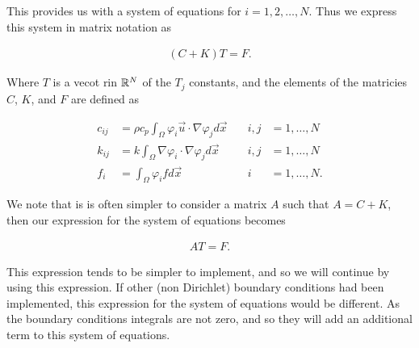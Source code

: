 \documentclass[../fem.tex]{subfiles}
\begin{document}
This provides us with a system of equations for $i=1,2,\ldots,N$. Thus we
express this system in matrix notation as

\begin{align}\label{eq:mat_rep}
  (C+K)T=F.
\end{align}

Where $T$ is a vecot rin $\mathbb{R}^N$ of the $T_j$ constants, and the elements of the
matricies $C$, $K$, and $F$ are defined as

\begin{align*}
  c_{ij}&=\rho c_p\int_\Omega\varphi_i\vec{u}\cdot\nabla\varphi_jd\vec{x}\quad
        &i,j&=1,\ldots,N\\
  k_{ij}&=k\int_\Omega\nabla\varphi_i\cdot\nabla\varphi_jd\vec{x}\quad
        &i,j&=1,\ldots,N\\
  f_i&=\int_\Omega\varphi_ifd\vec{x}\quad&i&=1,\ldots,N.
\end{align*}

We note that is is often simpler to consider a matrix $A$ such that $A=C+K$,
then our expression for the system of equations becomes

\begin{align*}
   AT=F.
\end{align*}

This expression tends to be simpler to implement, and so we will continue by
using this expression. If other (non Dirichlet) boundary conditions had been
implemented, this expression for the system of equations would be different. As
the boundary conditions integrals are not zero, and so they will add an
additional term to this system of equations.
\end{document}
